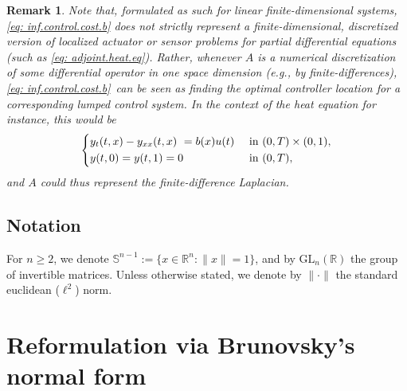 \documentclass[11pt, a4paper, reqno]{amsart}
\newcommand{\R}{\mathbb{R}}
\theoremstyle{plain}
\numberwithin{equation}{section}
\newtheorem{remark}{Remark}
\begin{document}
	\begin{remark} Note that, formulated as such for linear finite-dimensional systems, \eqref{eq: inf.control.cost.b} does not strictly represent a finite-dimensional, discretized version of localized actuator or sensor problems for partial differential equations (such as \eqref{eq: adjoint.heat.eq}). 
	Rather, whenever $A$ is a numerical discretization of some differential operator in one space dimension (e.g., by finite-differences),  \eqref{eq: inf.control.cost.b} can be seen as finding the optimal controller location for a corresponding \emph{lumped control system}. In the context of the heat equation for instance, this would be 
	\begin{equation}
	\begin{dcases}
	y_t(t,x) - y_{xx}(t,x) = b(x)u(t) &\text{ in } (0,T)\times(0,1),\\
	y(t,0) = y(t,1) = 0 &\text{ in } (0,T),
	\end{dcases}
	\end{equation}
	and $A$ could thus represent the finite-difference Laplacian.
	\end{remark}
	
	\subsection*{Notation} For $n\geqslant2$, we denote $\mathbb{S}^{n-1}:=\{x\in\R^n \colon \|x\|=1\}$, and by $\mathrm{GL}_n(\R)$ the group of invertible matrices. Unless otherwise stated, we denote by $\|\cdot\|$ the standard euclidean ($\ell^2$) norm. 
	
	\section{Reformulation via Brunovsky's normal form} \label{sec: brunovsky}
\end{document}

